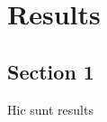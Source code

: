 
\chapter{Results}  %
\label{chapter 4}
\ifpdf
    \graphicspath{{Chapter4/Figs/}{Chapter4/Figs/PDF/}{Chapter4/Figs/}}
\else
    \graphicspath{{Chapter4/Figs/Vector/}{Chapter4/Figs/}}
\fi



\section{Section 1} 
\label{section 4.1} 
Hic sunt results

